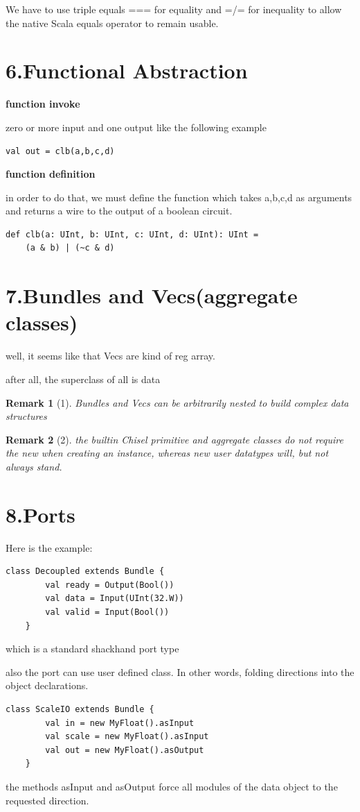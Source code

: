 \documentclass[11pt]{article}
\newtheorem*{remark}{Remark}
\begin{document}
We have to use triple equals === for equality and =/= for inequality to allow the native Scala equals operator to remain usable.

\section*{6.Functional Abstraction}
\textbf{function invoke}

zero or more input and one output like the following example
\begin{lstlisting}[style=myScalastyle]
val out = clb(a,b,c,d)
\end{lstlisting}
\textbf{function definition}

in order to do that, we must define the function which takes a,b,c,d as arguments and returns a wire to the output of a boolean circuit.
\begin{lstlisting}[style=myScalastyle]
def clb(a: UInt, b: UInt, c: UInt, d: UInt): UInt = 
	(a & b) | (~c & d)
\end{lstlisting}
\section*{7.Bundles and Vecs(aggregate classes)}
well, it seems like that Vecs are kind of reg array.

after all, the superclass of all is data
\begin{remark}[1]
	Bundles and Vecs can be arbitrarily nested to build complex data structures
\end{remark}
\begin{remark}[2]
	the builtin Chisel primitive and aggregate classes do not require the new when creating an instance, whereas new user datatypes will, but not always stand.
\end{remark}

\section*{8.Ports}
Here is the example:
\begin{lstlisting}[style=myScalastyle]
	class Decoupled extends Bundle {
		val ready = Output(Bool())
		val data = Input(UInt(32.W))
		val valid = Input(Bool())
	}
\end{lstlisting}
which is a standard shackhand port type

also the port can use user defined class. In other words, folding directions into the object declarations.
\begin{lstlisting}[style = myScalastyle]
	class ScaleIO extends Bundle {
		val in = new MyFloat().asInput
		val scale = new MyFloat().asInput
		val out = new MyFloat().asOutput
	}
\end{lstlisting}
the methods asInput and asOutput force all modules of the data object to the requested direction.
\end{document}
